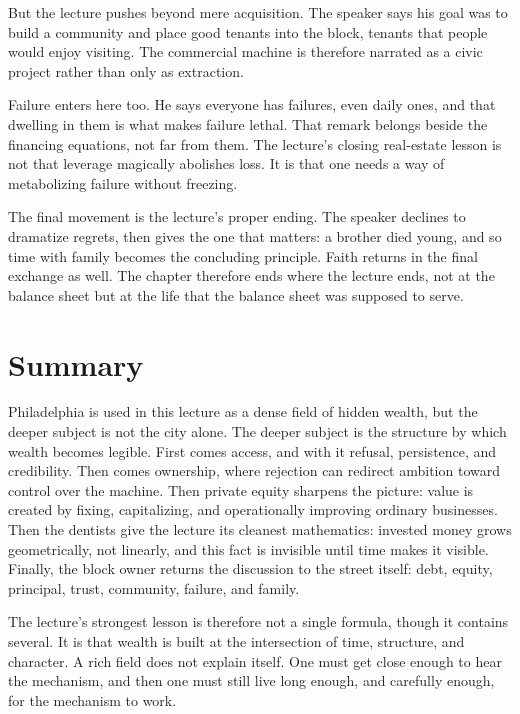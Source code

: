 But the lecture pushes beyond mere acquisition. The speaker says his goal was to build a community and place good tenants into the block, tenants that people would enjoy visiting. The commercial machine is therefore narrated as a civic project rather than only as extraction.

Failure enters here too. He says everyone has failures, even daily ones, and that dwelling in them is what makes failure lethal. That remark belongs beside the financing equations, not far from them. The lecture's closing real-estate lesson is not that leverage magically abolishes loss. It is that one needs a way of metabolizing failure without freezing.

The final movement is the lecture's proper ending. The speaker declines to dramatize regrets, then gives the one that matters: a brother died young, and so time with family becomes the concluding principle. Faith returns in the final exchange as well. The chapter therefore ends where the lecture ends, not at the balance sheet but at the life that the balance sheet was supposed to serve.

\section{Summary}

Philadelphia is used in this lecture as a dense field of hidden wealth, but the deeper subject is not the city alone. The deeper subject is the structure by which wealth becomes legible. First comes access, and with it refusal, persistence, and credibility. Then comes ownership, where rejection can redirect ambition toward control over the machine. Then private equity sharpens the picture: value is created by fixing, capitalizing, and operationally improving ordinary businesses. Then the dentists give the lecture its cleanest mathematics: invested money grows geometrically, not linearly, and this fact is invisible until time makes it visible. Finally, the block owner returns the discussion to the street itself: debt, equity, principal, trust, community, failure, and family.

The lecture's strongest lesson is therefore not a single formula, though it contains several. It is that wealth is built at the intersection of time, structure, and character. A rich field does not explain itself. One must get close enough to hear the mechanism, and then one must still live long enough, and carefully enough, for the mechanism to work.